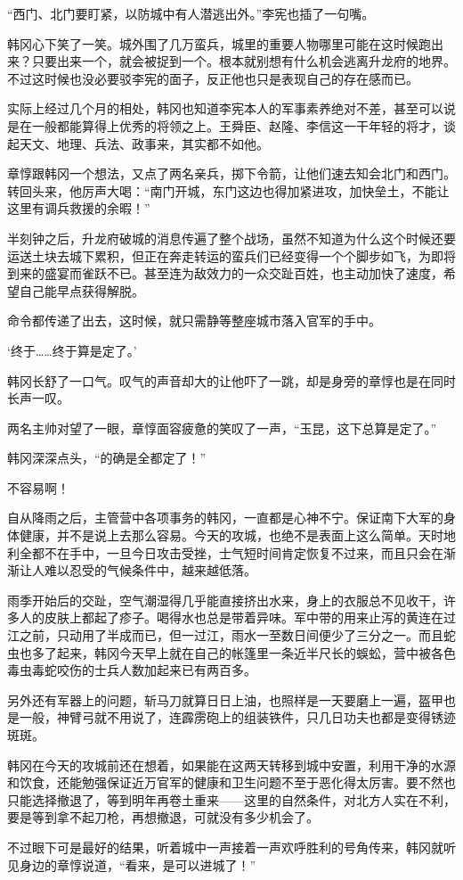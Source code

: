 “西门、北门要盯紧，以防城中有人潜逃出外。”李宪也插了一句嘴。

韩冈心下笑了一笑。城外围了几万蛮兵，城里的重要人物哪里可能在这时候跑出来？只要出来一个，就会被捉到一个。根本就别想有什么机会逃离升龙府的地界。不过这时候也没必要驳李宪的面子，反正他也只是表现自己的存在感而已。

实际上经过几个月的相处，韩冈也知道李宪本人的军事素养绝对不差，甚至可以说是在一般都能算得上优秀的将领之上。王舜臣、赵隆、李信这一干年轻的将才，谈起天文、地理、兵法、政事来，其实都不如他。

章惇跟韩冈一个想法，又点了两名亲兵，掷下令箭，让他们速去知会北门和西门。转回头来，他厉声大喝：“南门开城，东门这边也得加紧进攻，加快垒土，不能让这里有调兵救援的余暇！”

半刻钟之后，升龙府破城的消息传遍了整个战场，虽然不知道为什么这个时候还要运送土块去城下累积，但正在奔走转运的蛮兵们已经变得一个个脚步如飞，为即将到来的盛宴而雀跃不已。甚至连为敌效力的一众交趾百姓，也主动加快了速度，希望自己能早点获得解脱。

命令都传递了出去，这时候，就只需静等整座城市落入官军的手中。

‘终于……终于算是定了。’

韩冈长舒了一口气。叹气的声音却大的让他吓了一跳，却是身旁的章惇也是在同时长声一叹。

两名主帅对望了一眼，章惇面容疲惫的笑叹了一声，“玉昆，这下总算是定了。”

韩冈深深点头，“的确是全都定了！”

不容易啊！

自从降雨之后，主管营中各项事务的韩冈，一直都是心神不宁。保证南下大军的身体健康，并不是说上去那么容易。今天的攻城，也绝不是表面上这么简单。天时地利全都不在手中，一旦今日攻击受挫，士气短时间肯定恢复不过来，而且只会在渐渐让人难以忍受的气候条件中，越来越低落。

雨季开始后的交趾，空气潮湿得几乎能直接挤出水来，身上的衣服总不见收干，许多人的皮肤上都起了疹子。喝得水也总是带着异味。军中带的用来止泻的黄连在过江之前，只动用了半成而已，但一过江，雨水一至数日间便少了三分之一。而且蛇虫也多了起来，韩冈今天早上就在自己的帐篷里一条近半尺长的蜈蚣，营中被各色毒虫毒蛇咬伤的士兵人数加起来已有两百多。

另外还有军器上的问题，斩马刀就算日日上油，也照样是一天要磨上一遍，盔甲也是一般，神臂弓就不用说了，连霹雳砲上的组装铁件，只几日功夫也都是变得锈迹斑斑。

韩冈在今天的攻城前还在想着，如果能在这两天转移到城中安置，利用干净的水源和饮食，还能勉强保证近万官军的健康和卫生问题不至于恶化得太厉害。要不然也只能选择撤退了，等到明年再卷土重来——这里的自然条件，对北方人实在不利，要是等到拿不起刀枪，再想撤退，可就没有多少机会了。

不过眼下可是最好的结果，听着城中一声接着一声欢呼胜利的号角传来，韩冈就听见身边的章惇说道，“看来，是可以进城了！”

